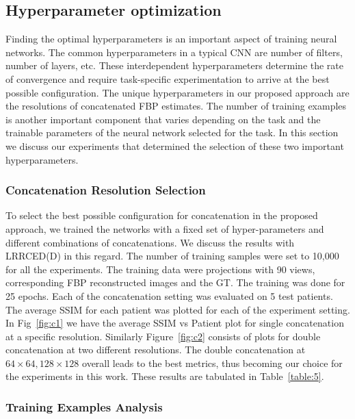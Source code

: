 \subsection{Hyperparameter optimization}

Finding the optimal hyperparameters is an important aspect of training neural networks. The common hyperparameters in a typical \ac{CNN} are number of filters, number of layers, etc. These interdependent hyperparameters  determine the rate of convergence and require task-specific experimentation to arrive at the best possible configuration. The unique hyperparameters in our proposed approach are the resolutions of concatenated \ac{FBP} estimates. The number of training examples is another important component that varies depending on the task and the trainable parameters of the neural network selected for the task. In this section we discuss our experiments that determined the selection of these two important hyperparameters. 

\subsubsection{Concatenation Resolution Selection} \label{sec:concat}

To select the best possible configuration for concatenation in the proposed approach, we trained the networks with a fixed set of hyper-parameters and different combinations of concatenations. We discuss the results with \ac{LRRCED}(D) in this regard. The number of training samples were set to 10,000 for all the experiments. The training data were projections with 90 views, corresponding \ac{FBP} reconstructed images and the \ac{GT}. The training was done for 25 epochs. Each of the concatenation setting was evaluated on 5 test patients. The average \ac{SSIM} for each patient was plotted for each of the experiment setting. In Fig~\ref{fig:c1} we have the average \ac{SSIM} vs Patient plot for single concatenation at a specific resolution. Similarly Figure~\ref{fig:c2} consists of plots for double concatenation at two different resolutions. The double concatenation at $64\times64, 128\times128$ overall leads to the best metrics, thus becoming our choice for the experiments in this work. These results are tabulated in Table~\ref{table:5}.



\subsubsection{Training Examples Analysis}

